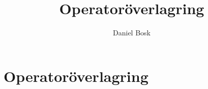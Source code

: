 \documentclass[a4paper,10pt,oneside,openright,
               oldfontcommands]{memoir}
\begin{document}
\title{%
  Operatoröverlagring
}
\author{Daniel Bosk}

\maketitle

\begin{abstract}
  
\end{abstract}

\clearpage

\tableofcontents*

\chapter{Operatoröverlagring}



\appendix


\printbibliography
\end{document}
